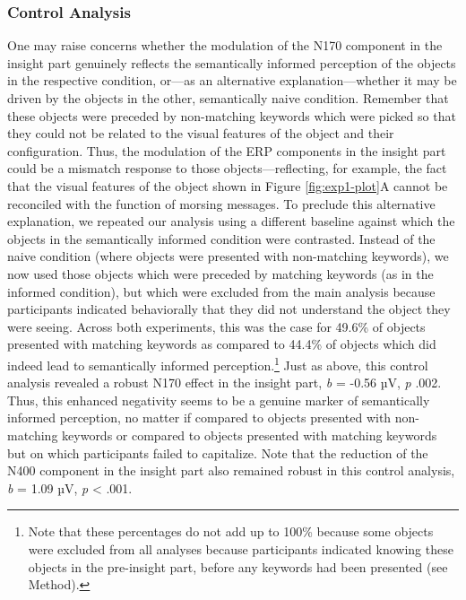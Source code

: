 \documentclass[
  english,
  man,floatsintext]{apa7}
\begin{document}
\hypertarget{control-analysis}{%
\subsubsection{Control Analysis}\label{control-analysis}}

One may raise concerns whether the modulation of the N170 component in the insight part genuinely reflects the semantically informed perception of the objects in the respective condition, or---as an alternative explanation---whether it may be driven by the objects in the other, semantically naive condition. Remember that these objects were preceded by non-matching keywords which were picked so that they could not be related to the visual features of the object and their configuration. Thus, the modulation of the ERP components in the insight part could be a mismatch response to those objects---reflecting, for example, the fact that the visual features of the object shown in Figure \ref{fig:exp1-plot}A cannot be reconciled with the function of morsing messages. To preclude this alternative explanation, we repeated our analysis using a different baseline against which the objects in the semantically informed condition were contrasted. Instead of the naive condition (where objects were presented with non-matching keywords), we now used those objects which were preceded by matching keywords (as in the informed condition), but which were excluded from the main analysis because participants indicated behaviorally that they did not understand the object they were seeing. Across both experiments, this was the case for 49.6\% of objects presented with matching keywords as compared to 44.4\% of objects which did indeed lead to semantically informed perception.\footnote{Note that these percentages do not add up to 100\% because some objects were excluded from all analyses because participants indicated knowing these objects in the pre-insight part, before any keywords had been presented (see Method).} Just as above, this control analysis revealed a robust N170 effect in the insight part, \emph{b} = -0.56 µV, \emph{p} .002. Thus, this enhanced negativity seems to be a genuine marker of semantically informed perception, no matter if compared to objects presented with non-matching keywords or compared to objects presented with matching keywords but on which participants failed to capitalize. Note that the reduction of the N400 component in the insight part also remained robust in this control analysis, \emph{b} = 1.09 µV, \emph{p} \textless{} .001.
\end{document}
